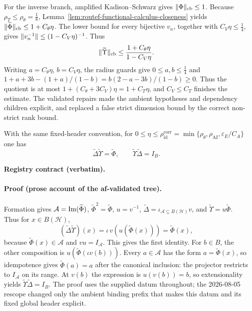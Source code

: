 For the inverse branch, amplified Kadison--Schwarz gives $\lVert \Phi\rVert_{\mathrm{cb}}\le1$.
Because $\rho_T\le\rho_\theta=\tfrac18$,
Lemma~\ref{lem:routef-functional-calculus-closeness} yields
$\lVert \widetilde\Phi\rVert_{\mathrm{cb}}\le1+C_\theta\eta$.
The lower bound for every bijective $v_n$, together with $C_V\eta\le\tfrac14$,
gives $\lVert v_n^{-1}\rVert\le(1-C_V\eta)^{-1}$.  Thus
\[
 \lVert \widetilde\Upsilon\rVert_{\mathrm{cb}}
 \le\frac{1+C_\theta\eta}{1-C_V\eta}.
\]
Writing $a=C_\theta\eta$, $b=C_V\eta$, the radius guards give $0\le a,b\le\tfrac14$ and
$1+a+3b-(1+a)/(1-b)=b(2-a-3b)/(1-b)\ge0$.  Thus the quotient is at most
$1+(C_\theta+3C_V)\eta=1+C_T\eta$, and $C_V\le C_T$ finishes the estimate.
The validated repairs made the ambient hypotheses and dependency children explicit,
and replaced a false strict dimension bound by the correct non-strict rank bound.

\begin{lemma}\label{lem:routef-raw-factor-identities}
With the same fixed-header convention, for
$0\le\eta\le\rho_{\mathrm{id}}^{\mathrm{corr}}
=\min\{\rho_\theta,\rho_{\mathrm{AI}},\varepsilon_E/C_A\}$ one has
\[
 \widetilde\Delta\widetilde\Upsilon=\widetilde\Phi,
 \qquad
 \widetilde\Upsilon\widetilde\Delta=I_B.
\]
\end{lemma}
\noindent\textbf{Registry contract (verbatim).}
\paragraph{Proof (prose account of the af-validated tree).}
Formation gives $\mathcal A=\operatorname{Im}(\widetilde\Phi)$, $\widetilde\Phi^2=\widetilde\Phi$,
$u=v^{-1}$,
$\widetilde\Delta=\iota_{\mathcal A\subseteq B(\mathcal H)}v$, and
$\widetilde\Upsilon=u\widetilde\Phi$.  Thus for $x\in B(\mathcal H)$,
\[
 (\widetilde\Delta\widetilde\Upsilon)(x)
 =\iota\,v(u(\widetilde\Phi(x)))=\widetilde\Phi(x),
\]
because $\widetilde\Phi(x)\in\mathcal A$ and $vu=I_{\mathcal A}$.  This gives the
first identity.  For $b\in B$, the other composition is
$u(\widetilde\Phi(\iota v(b)))$.  Every $a\in\mathcal A$ has the form
$a=\widetilde\Phi(x)$, so idempotence gives
$\widetilde\Phi(a)=a$ after the canonical inclusion: the projector restricts to
$I_{\mathcal A}$ on its range.  At $v(b)$ the expression is $u(v(b))=b$, so
extensionality yields $\widetilde\Upsilon\widetilde\Delta=I_B$.  The proof uses the
supplied datum throughout; the 2026-08-05 rescope changed only the ambient binding
prefix that makes this datum and its fixed global header explicit.

